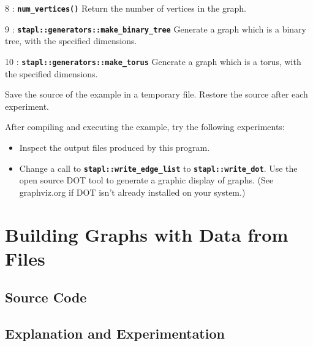 \documentclass{report}
\begin{document}
\begin{hashitemize}
\item 8 : \texttt{{\bf num\_vertices()}}
\newline
Return the number of vertices in the graph.

\item 9 : \texttt{{\bf stapl::generators::make\_binary\_tree}}
\newline
Generate a graph which is a binary tree, with the specified dimensions.

\item 10 : \texttt{{\bf stapl::generators::make\_torus}}
\newline
Generate a graph which is a torus, with the specified dimensions.

\end{hashitemize}

Save the source of the example in a temporary file.
Restore the source after each experiment.

After compiling and executing the example, try the following experiments:
\begin{itemize}
\item
Inspect the output files produced by this program.
\item
Change a call to \texttt{{\bf stapl::write\_edge\_list}} to
\texttt{{\bf stapl::write\_dot}}.  Use the open source DOT tool to generate
a graphic display of graphs.  (See graphviz.org if DOT isn't already
installed on your system.)
\end{itemize}


\pagebreak
\section{Building Graphs with Data from Files}

\subsection{Source Code}



\subsection{Explanation and Experimentation}
\end{document}
